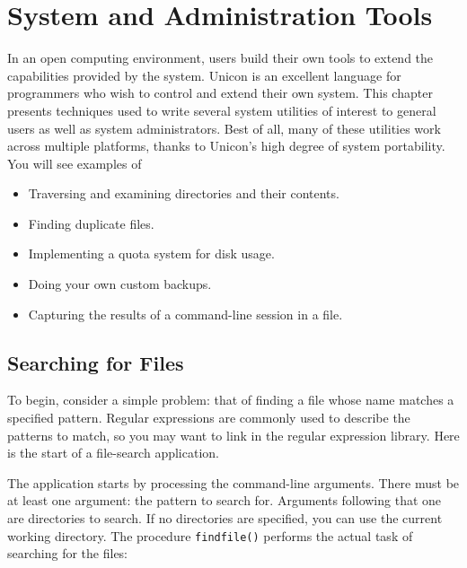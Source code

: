 \chapter{System and Administration Tools}

In an open computing environment, users build their own tools to extend
the capabilities provided by the system. Unicon is an excellent
language for programmers who wish to control and extend their own
system. This chapter presents techniques used to write several
system utilities of interest to general users as well as system
administrators. Best of all, many of these utilities work across
multiple platforms, thanks to Unicon's high degree of
system portability. You will see examples of

\begin{itemize}
\item Traversing and examining directories and their contents.
\item Finding duplicate files.
\item Implementing a quota system for disk usage.
\item Doing your own custom backups.
\item Capturing the results of a command-line session in a file.
\end{itemize}

\section{Searching for Files}

To begin, consider a simple problem: that of finding a file whose name
matches a specified pattern. Regular expressions are commonly used to
describe the patterns to match, so you may want to link in the regular
expression library. Here is the start of a file-search application.


The application starts by processing the
command-line arguments. There must be at least
one argument: the pattern to search for. Arguments following that one
are directories to search. If no directories are specified, you can use
the current working directory. The procedure
\texttt{findfile()} performs the actual task of searching for the
files: 

